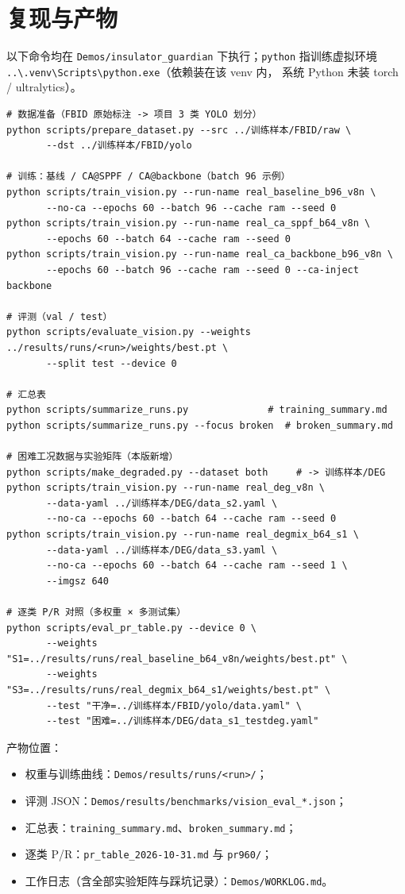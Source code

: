 \documentclass[UTF8,a4paper,11pt]{ctexart}
\begin{document}
\section{复现与产物}

\noindent 以下命令均在 \texttt{Demos/insulator\_guardian} 下执行；\texttt{python} 指训练虚拟环境
\texttt{..\textbackslash.venv\textbackslash Scripts\textbackslash python.exe}（依赖装在该 venv 内，
系统 Python 未装 torch / ultralytics）。

\begin{verbatim}
# 数据准备（FBID 原始标注 -> 项目 3 类 YOLO 划分）
python scripts/prepare_dataset.py --src ../训练样本/FBID/raw \
       --dst ../训练样本/FBID/yolo

# 训练：基线 / CA@SPPF / CA@backbone（batch 96 示例）
python scripts/train_vision.py --run-name real_baseline_b96_v8n \
       --no-ca --epochs 60 --batch 96 --cache ram --seed 0
python scripts/train_vision.py --run-name real_ca_sppf_b64_v8n \
       --epochs 60 --batch 64 --cache ram --seed 0
python scripts/train_vision.py --run-name real_ca_backbone_b96_v8n \
       --epochs 60 --batch 96 --cache ram --seed 0 --ca-inject backbone

# 评测（val / test）
python scripts/evaluate_vision.py --weights ../results/runs/<run>/weights/best.pt \
       --split test --device 0

# 汇总表
python scripts/summarize_runs.py              # training_summary.md
python scripts/summarize_runs.py --focus broken  # broken_summary.md

# 困难工况数据与实验矩阵（本版新增）
python scripts/make_degraded.py --dataset both     # -> 训练样本/DEG
python scripts/train_vision.py --run-name real_deg_v8n \
       --data-yaml ../训练样本/DEG/data_s2.yaml \
       --no-ca --epochs 60 --batch 64 --cache ram --seed 0
python scripts/train_vision.py --run-name real_degmix_b64_s1 \
       --data-yaml ../训练样本/DEG/data_s3.yaml \
       --no-ca --epochs 60 --batch 64 --cache ram --seed 1 \
       --imgsz 640

# 逐类 P/R 对照（多权重 × 多测试集）
python scripts/eval_pr_table.py --device 0 \
       --weights "S1=../results/runs/real_baseline_b64_v8n/weights/best.pt" \
       --weights "S3=../results/runs/real_degmix_b64_s1/weights/best.pt" \
       --test "干净=../训练样本/FBID/yolo/data.yaml" \
       --test "困难=../训练样本/DEG/data_s1_testdeg.yaml"
\end{verbatim}

\noindent 产物位置：
\begin{itemize}
  \item 权重与训练曲线：\texttt{Demos/results/runs/<run>/}；
  \item 评测 JSON：\texttt{Demos/results/benchmarks/vision\_eval\_*.json}；
  \item 汇总表：\texttt{training\_summary.md}、\texttt{broken\_summary.md}；
  \item 逐类 P/R：\texttt{pr\_table\_2026-10-31.md} 与 \texttt{pr960/}；
  \item 工作日志（含全部实验矩阵与踩坑记录）：\texttt{Demos/WORKLOG.md}。
\end{itemize}
\end{document}
